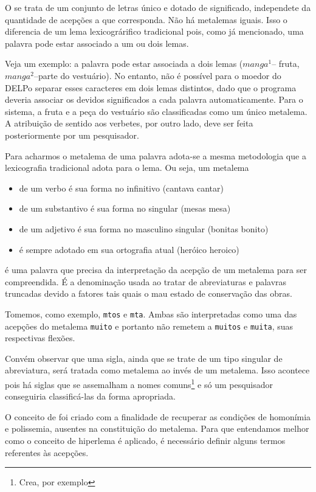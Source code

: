 O  se trata de um conjunto de letras único e dotado de significado,
independete da quantidade de acepções a que corresponda. Não há metalemas iguais.
Isso o diferencia de um lema lexicográrifico tradicional pois, como já mencionado,
uma palavra pode estar associado a um ou dois lemas.

Veja um exemplo: a palavra  pode estar associada a dois lemas ($manga^1$--
fruta, $manga^2$--parte do vestuário). No entanto, não é possível para o moedor do
DELPo separar esses caracteres em dois lemas distintos, dado que o programa deveria
associar os devidos significados a cada palavra automaticamente. Para o sistema, a
fruta e a peça do vestuário são classificadas como um único metalema. A atribuição
de sentido aos verbetes, por outro lado, deve ser feita posteriormente por um
pesquisador.

Para acharmos o metalema de uma palavra adota-se a mesma metodologia que a lexicografia
tradicional adota para o lema. Ou seja, um metalema
\begin{itemize}
    \item de um verbo é sua forma no infinitivo (cantava \dir cantar)
    \item de um substantivo é sua forma no singular (mesas \dir mesa)
    \item de um adjetivo é sua forma no masculino singular (bonitas \dir bonito)
    \item é sempre adotado em sua ortografia atual (heróico \dir heroico)
\end{itemize}

 é uma palavra que precisa da interpretação da acepção de um metalema para ser
compreendida. É a denominação usada ao tratar de abreviaturas e palavras truncadas devido a
fatores tais quais o mau estado de conservação das obras.

Tomemos, como exemplo, \texttt{mtos} e \texttt{mta}. Ambas são interpretadas como uma das
acepções do metalema \texttt{muito} e portanto não remetem a \texttt{muitos} e \texttt{muita},
suas respectivas flexões.

Convém observar que uma sigla, ainda que se trate de um tipo singular de abreviatura, será
tratada como metalema ao invés de um metalema. Isso acontece pois há siglas que se assemalham
a nomes comuns\footnote{Crea, por exemplo} e só um pesquisador conseguiria classificá-las
da forma apropriada.

O conceito de  foi criado com a finalidade de recuperar as condições de homonímia
e polissemia, ausentes na constituição do metalema. Para que entendamos melhor como o conceito
de hiperlema é aplicado, é necessário definir alguns termos referentes às acepções.

